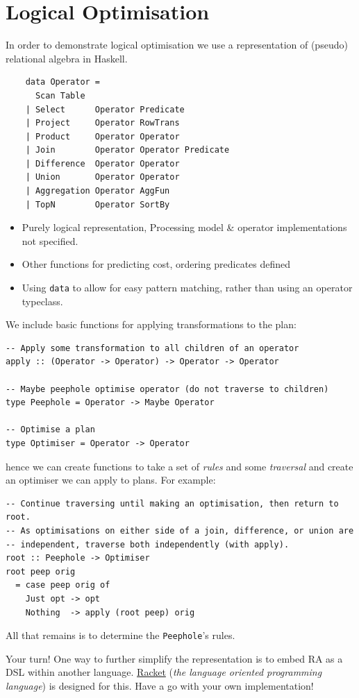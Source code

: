 \section{Logical Optimisation}
In order to demonstrate logical optimisation we use a representation of 
(pseudo) relational algebra in Haskell.
\begin{center}
\begin{minipage}{.5\textwidth}
    \begin{verbatim}
    data Operator = 
      Scan Table
    | Select      Operator Predicate
    | Project     Operator RowTrans
    | Product     Operator Operator
    | Join        Operator Operator Predicate
    | Difference  Operator Operator
    | Union       Operator Operator
    | Aggregation Operator AggFun
    | TopN        Operator SortBy
    \end{verbatim} 
\end{minipage} \hfill \begin{minipage}{.49\textwidth}
    \begin{itemize}
        \item Purely logical representation, Processing model \& operator implementations not specified.
        \item Other functions for predicting cost, ordering predicates defined
        \item Using \texttt{data} to allow for easy pattern matching, rather than using an operator typeclass.
    \end{itemize}
\end{minipage}
\end{center}
We include basic functions for applying transformations to the plan:
\begin{verbatim}
-- Apply some transformation to all children of an operator
apply :: (Operator -> Operator) -> Operator -> Operator

-- Maybe peephole optimise operator (do not traverse to children)
type Peephole = Operator -> Maybe Operator

-- Optimise a plan 
type Optimiser = Operator -> Operator
\end{verbatim}
hence we can create functions to take a set of \textit{rules} and some \textit{traversal} and create an optimiser we can apply to plans. For example:
\begin{verbatim}
-- Continue traversing until making an optimisation, then return to root.
-- As optimisations on either side of a join, difference, or union are 
-- independent, traverse both independently (with apply).
root :: Peephole -> Optimiser
root peep orig 
  = case peep orig of
    Just opt -> opt
    Nothing  -> apply (root peep) orig
\end{verbatim} 
All that remains is to determine the \texttt{Peephole}'s rules.
\begin{sidenotebox}{Your turn!}
    One way to further simplify the representation is to embed RA as a DSL within another language. \href{https://racket-lang.org/}{Racket} (\textit{the language oriented programming language}) is designed for this. Have a go with your own implementation!
\end{sidenotebox}
